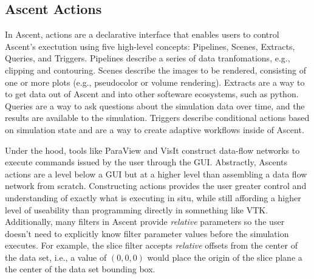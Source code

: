 \subsection{Ascent Actions}
In Ascent, actions are a declarative interface that enables users to
control Ascent's exectution using five high-level concepts:
Pipelines, Scenes, Extracts, Queries, and Triggers.
%
Pipelines describe a series of data tranfomations, e.g.,
clipping and contouring.
%
Scenes describe the images to be rendered, consisting of one or more
plots (e.g., pseudocolor or volume rendering).
%
Extracts are a way to to get data out of Ascent and into other softeware
ecosystems, such as python.
%
Queries are a way to ask questions about the simulation data over time, and
the results are available to the simulation.
%
Triggers describe conditional actions based on simulation state and are a way
to create adaptive workflows inside of Ascent.

Under the hood, tools like ParaView and VisIt construct data-flow networks
to execute commands issued by the user through the GUI.
%
Abstractly, Ascents actions are a level below a GUI but at a higher level
than assembling a data flow network from scratch.
%
Constructing actions provides the user greater control and understanding
of exactly what is executing in situ, while still affording a higher level of
useability than programming directly in somnething like VTK.
%
Additionally, many filters in Ascent provide \textit{relative}
parameters so the user doesn't need to explicitly know filter parameter values
before the simulation executes.
%
For example, the slice filter accepts \textit{relative} offsets from the
center of the data set, i.e., a value of $(0,0,0)$ would place the origin
of the slice plane a the center of the data set bounding box.

%


